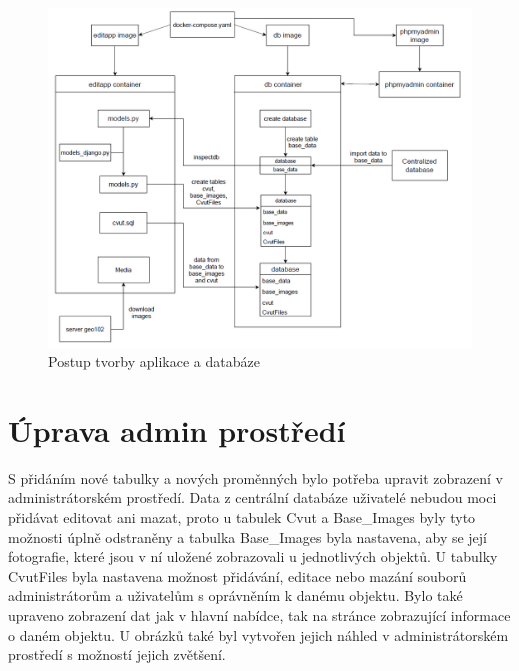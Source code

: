 \begin{figure}[H] \centering
    \includegraphics[width=400pt]{./pictures/diagram-docker.PNG}
    \caption[Postup tvorby aplikace a databáze]{Postup tvorby aplikace a databáze}
	\label{fig:Postup tvorby aplikace a databáze}              
\end{figure}


\newpage

\section{Úprava admin prostředí}

S přidáním nové tabulky a nových proměnných bylo potřeba upravit
zobrazení v administrátorském prostředí. Data z centrální databáze
uživatelé nebudou moci přidávat editovat ani mazat, proto u tabulek
Cvut a Base\_Images byly tyto možnosti úplně odstraněny a tabulka
Base\_Images byla nastavena, aby se její fotografie, které jsou v ní
uložené zobrazovali u jednotlivých objektů. U tabulky CvutFiles byla
nastavena možnost přidávání, editace nebo mazání souborů
administrátorům a uživatelům s oprávněním k danému objektu. Bylo také
upraveno zobrazení dat jak v hlavní nabídce, tak na stránce
zobrazující informace o daném objektu. U obrázků také byl vytvořen
jejich náhled v administrátorském prostředí s možností jejich
zvětšení.

